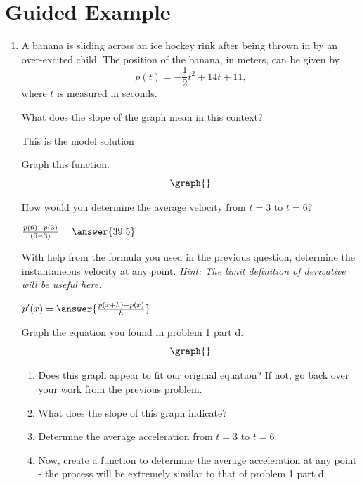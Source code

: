 \documentclass{ximera}
\begin{document}
\section{Guided Example}
\begin{enumerate}
\item {A banana is sliding across an ice hockey rink after being thrown in by an over-excited child. The position of the banana, in meters, can be given by $$p(t) = -\dfrac{1}{2}t^2+14t+11\text{,}$$ where $t$ is measured in seconds.}

\begin{question}
What does the slope of the graph mean in this context?
\begin{freeResponse}
This is the model solution %
\end{freeResponse}
\end{question}

\begin{question}
Graph this function.
\[
    \graph{}
\]
\end{question}

\begin{question}
How would you determine the average velocity from $t = 3$ to $t = 6$?

$ \frac{p(6)-p(3)}{(6-3)}  =  \answer{39.5}$
\end{question}

\begin{question}
With help from the formula you used in the previous question, determine the instantaneous velocity at any point. \textit{Hint: The limit definition of derivative will be useful here.}

$ p'(x) =  \answer{\frac{p(x+h)-p(x)}{h}}$
\end{question}

\begin{question}
Graph the equation you found in problem 1 part d.
\[
    \graph{}
\]
\end{question}

\begin{enumerate}
\item{Does this graph appear to fit our original equation? If not, go back over your work from the previous problem.}
\item{What does the slope of this graph indicate?}
\item{Determine the average acceleration from $t = 3$ to $t = 6$.}
\item{Now, create a function to determine the average acceleration at any point - the process will be extremely similar to that of problem 1 part d.}
\end{enumerate}
\end{enumerate}
\end{document}
